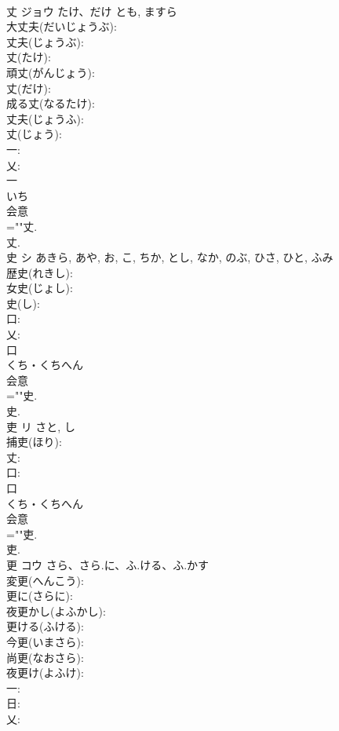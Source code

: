 \documentclass[8pt]{extreport}
\begin{document}
\begin{CJK}{UTF8}{min}
\\	丈	ジョウ	たけ、だけ	とも, ますら	
\\	大丈夫(だいじょうぶ): 
\\	丈夫(じょうぶ): 
\\	丈(たけ): 
\\	頑丈(がんじょう): 
\\	丈(だけ): 
\\	成る丈(なるたけ): 
\\	丈夫(じょうふ): 
\\	丈(じょう): 
\\	一: 
\\	乂: 
\\	一	
\\	いち	
\\	会意 
\\	=""丈.
\\	丈.
\\	史	シ		あきら, あや, お, こ, ちか, とし, なか, のぶ, ひさ, ひと, ふみ	
\\	歴史(れきし): 
\\	女史(じょし): 
\\	史(し): 
\\	口: 
\\	乂: 
\\	口	
\\	くち・くちへん	
\\	会意 
\\	=""史.
\\	史.
\\	吏	リ		さと, し	
\\	捕吏(ほり): 
\\	丈: 
\\	口: 
\\	口	
\\	くち・くちへん	
\\	会意 
\\	=""吏.
\\	吏.
\\	更	コウ	さら、さら.に、ふ.ける、ふ.かす		
\\	変更(へんこう): 
\\	更に(さらに): 
\\	夜更かし(よふかし): 
\\	更ける(ふける): 
\\	今更(いまさら): 
\\	尚更(なおさら): 
\\	夜更け(よふけ): 
\\	一: 
\\	日: 
\\	乂: 

\end{CJK}
\end{document}
